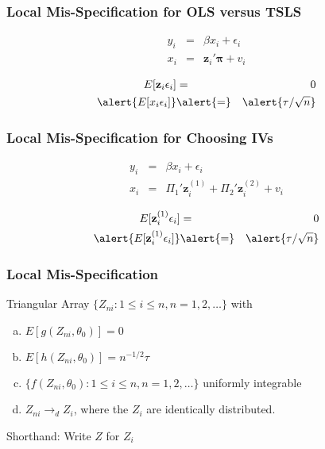 \begin{frame}
	\frametitle{Local Mis-Specification for OLS versus TSLS}


	\begin{eqnarray*}
	y_{i} &=& \beta x_{i}  + \epsilon_{i}\\
	x_{i} &=& \mathbf{z}_{i}' \boldsymbol{\pi} + v_{i}
	\end{eqnarray*}

	\begin{eqnarray*}
	E[\mathbf{z}_i \epsilon_i] &=& 0\\
	\alert{E[x_i \epsilon_i]} &\alert{=}& \alert{\tau/\sqrt{n}}
	\end{eqnarray*}
\end{frame}
\begin{frame}

	\frametitle{Local Mis-Specification for Choosing IVs}

		\begin{eqnarray*}
    		y_i &=& \beta x_i +  \epsilon_i\\
    		x_i &=&  \Pi_1' \mathbf{z}_{i}^{(1)} + \Pi_2'\mathbf{z}_{i}^{(2)} + v_i
		\end{eqnarray*}

		\begin{eqnarray*}
			E[\mathbf{z}_{i}^{(1)}\epsilon_i] &=& 0\\
			\alert{E[\mathbf{z}_{i}^{(1)}\epsilon_i]} &\alert{=}& \alert{\tau/\sqrt{n}}
		\end{eqnarray*}
\end{frame}
\begin{frame}
	\frametitle{Local Mis-Specification}
Triangular Array $\{Z_{ni}\colon 1\leq i \leq n, n =1, 2, \hdots\}$  with
	\begin{enumerate}[(a)]
		\item $E[g(Z_{ni},\theta_0)] = 0$
		\item $E[h(Z_{ni},\theta_0)] = n^{-1/2}\tau$
		\item $\{f(Z_{ni},\theta_0)\colon 1\leq i \leq n, n = 1, 2, \hdots\}$ uniformly integrable
		\item $Z_{ni} \rightarrow_d Z_i$, where the $Z_i$ are identically distributed.
	\end{enumerate}

	\alert{Shorthand: Write $Z$ for $Z_i$}
\end{frame}

